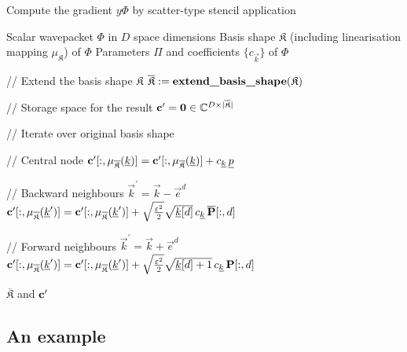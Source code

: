 \begin{algorithm}
\caption{Compute the gradient $y \Phi$ by scatter-type stencil application}
\label{al:grad_phi_scatter_type}
\begin{algorithmic}
  \REQUIRE Scalar wavepacket $\Phi$ in $D$ space dimensions
  \REQUIRE Basis shape $\mathfrak{K}$ (including linearisation mapping $\mu_{\mathfrak{K}}$) of $\Phi$
  \REQUIRE Parameters $\Pi$ and coefficients $\{c_{\vec{k}}\}$ of $\Phi$

  \STATE // Extend the basis shape $\mathfrak{K}$
  \STATE $\overline{\mathfrak{K}} := \text{\bf{extend\_basis\_shape}}(\mathfrak{K})$

  \STATE // Storage space for the result
  \STATE $\mathbf{c}^\prime = \mathbf{0} \in \mathbb{C}^{D \times |\overline{\mathfrak{K}}|}$

  \STATE // Iterate over original basis shape

    \STATE // Central node
    \STATE $\mathbf{c}^\prime[:,\mu_{\overline{\mathfrak{K}}}(\underline{k})] =
            \mathbf{c}^\prime[:,\mu_{\overline{\mathfrak{K}}}(\underline{k})] +
            c_{\underline{k}} \, \underline{p}$

    \STATE // Backward neighbours
      \STATE $\vec{k}^\prime = \vec{k} - \vec{e}^d$
        \STATE $\mathbf{c}^\prime[:,\mu_{\overline{\mathfrak{K}}}(\underline{k}^\prime)] =
                \mathbf{c}^\prime[:,\mu_{\overline{\mathfrak{K}}}(\underline{k}^\prime)] +
                \sqrt{\frac{\varepsilon^2}{2}} \sqrt{\underline{k}[d]} \, c_{\underline{k}} \, \overline{\mathbf{P}}[:,d]$
      \ENDIF
    \ENDFOR

    \STATE // Forward neighbours
      \STATE $\vec{k}^\prime = \vec{k} + \vec{e}^d$
        \STATE $\mathbf{c}^\prime[:,\mu_{\overline{\mathfrak{K}}}(\underline{k}^\prime)] =
                \mathbf{c}^\prime[:,\mu_{\overline{\mathfrak{K}}}(\underline{k}^\prime)] +
                \sqrt{\frac{\varepsilon^2}{2}} \sqrt{\underline{k}[d]+1} \, c_{\underline{k}} \, \mathbf{P}[:,d]$
      \ENDIF
    \ENDFOR

  \ENDFOR
  \RETURN $\overline{\mathfrak{K}}$ and $\mathbf{c}^\prime$
\end{algorithmic}
\end{algorithm}


\subsection{An example}


